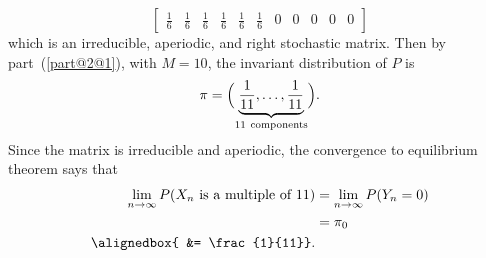 \documentclass[
  coursecode={MTHE 455},
  assignmentname={Assignment \assignmentnumber},
  studentnumber=20053722,
  name={Bryan Hoang},
  draft,
]{
  ltxanswer%
}
\begin{document}
\begin{questions}
\begin{parts}
\begin{solution}
\begin{equation*}
\begin{bmatrix}
            \frac{1}{6} & \frac{1}{6} & \frac{1}{6} & \frac{1}{6} & \frac{1}{6} & \frac{1}{6} & 0           & 0           & 0           & 0           & 0
          \end{bmatrix}
        \end{equation*}
        which is an irreducible, aperiodic, and right stochastic matrix. Then by part~(\ref{part@2@1}), with \(M=10\), the invariant distribution of \(P\) is
        \begin{equation*}
          \pi = \Bigl(\underbrace{\frac{1}{11},\dotsc,\frac{1}{11}}_{11\ \text{components}}\Bigr).
        \end{equation*}
        Since the matrix is irreducible and aperiodic, the convergence to equilibrium theorem says that
        \begin{align*}
          \lim_{n \to \infty} P(X_{n}\ \text{is a multiple of}\ 11) &= \lim_{n \to \infty} P(Y_{n}=0) \\
                                                                    &= \pi_{0}                        \\
          \alignedbox{                                              &= \frac{1}{11}}.
        \end{align*}
      \end{solution}
    \end{parts}
  \end{questions}
\end{document}
